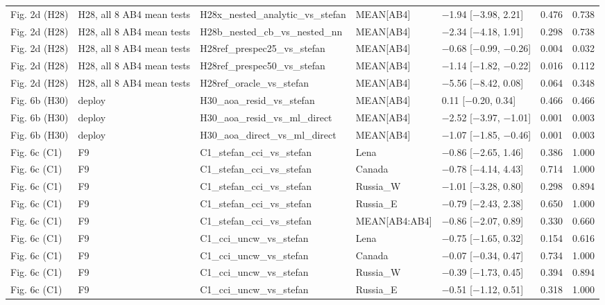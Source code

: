 \begin{longtable}{lllllrr}
Fig. 2d (H28) & H28, all 8 AB4 mean tests & H28x\_nested\_analytic\_vs\_stefan & MEAN[AB4] & $-$1.94 [$-$3.98, 2.21] & 0.476 & 0.738 \\
Fig. 2d (H28) & H28, all 8 AB4 mean tests & H28b\_nested\_cb\_vs\_nested\_nn & MEAN[AB4] & $-$2.34 [$-$4.18, 1.91] & 0.298 & 0.738 \\
Fig. 2d (H28) & H28, all 8 AB4 mean tests & H28ref\_prespec25\_vs\_stefan & MEAN[AB4] & $-$0.68 [$-$0.99, $-$0.26] & 0.004 & 0.032 \\
Fig. 2d (H28) & H28, all 8 AB4 mean tests & H28ref\_prespec50\_vs\_stefan & MEAN[AB4] & $-$1.14 [$-$1.82, $-$0.22] & 0.016 & 0.112 \\
Fig. 2d (H28) & H28, all 8 AB4 mean tests & H28ref\_oracle\_vs\_stefan & MEAN[AB4] & $-$5.56 [$-$8.42, 0.08] & 0.064 & 0.348 \\
Fig. 6b (H30) & deploy & H30\_aoa\_resid\_vs\_stefan & MEAN[AB4] & 0.11 [$-$0.20, 0.34] & 0.466 & 0.466 \\
Fig. 6b (H30) & deploy & H30\_aoa\_resid\_vs\_ml\_direct & MEAN[AB4] & $-$2.52 [$-$3.97, $-$1.01] & 0.001 & 0.003 \\
Fig. 6b (H30) & deploy & H30\_aoa\_direct\_vs\_ml\_direct & MEAN[AB4] & $-$1.07 [$-$1.85, $-$0.46] & 0.001 & 0.003 \\
Fig. 6c (C1) & F9 & C1\_stefan\_cci\_vs\_stefan & Lena & $-$0.86 [$-$2.65, 1.46] & 0.386 & 1.000 \\
Fig. 6c (C1) & F9 & C1\_stefan\_cci\_vs\_stefan & Canada & $-$0.78 [$-$4.14, 4.43] & 0.714 & 1.000 \\
Fig. 6c (C1) & F9 & C1\_stefan\_cci\_vs\_stefan & Russia\_W & $-$1.01 [$-$3.28, 0.80] & 0.298 & 0.894 \\
Fig. 6c (C1) & F9 & C1\_stefan\_cci\_vs\_stefan & Russia\_E & $-$0.79 [$-$2.43, 2.38] & 0.650 & 1.000 \\
Fig. 6c (C1) & F9 & C1\_stefan\_cci\_vs\_stefan & MEAN[AB4:AB4] & $-$0.86 [$-$2.07, 0.89] & 0.330 & 0.660 \\
Fig. 6c (C1) & F9 & C1\_cci\_uncw\_vs\_stefan & Lena & $-$0.75 [$-$1.65, 0.32] & 0.154 & 0.616 \\
Fig. 6c (C1) & F9 & C1\_cci\_uncw\_vs\_stefan & Canada & $-$0.07 [$-$0.34, 0.47] & 0.734 & 1.000 \\
Fig. 6c (C1) & F9 & C1\_cci\_uncw\_vs\_stefan & Russia\_W & $-$0.39 [$-$1.73, 0.45] & 0.394 & 0.894 \\
Fig. 6c (C1) & F9 & C1\_cci\_uncw\_vs\_stefan & Russia\_E & $-$0.51 [$-$1.12, 0.51] & 0.318 & 1.000 \\

\end{longtable}
